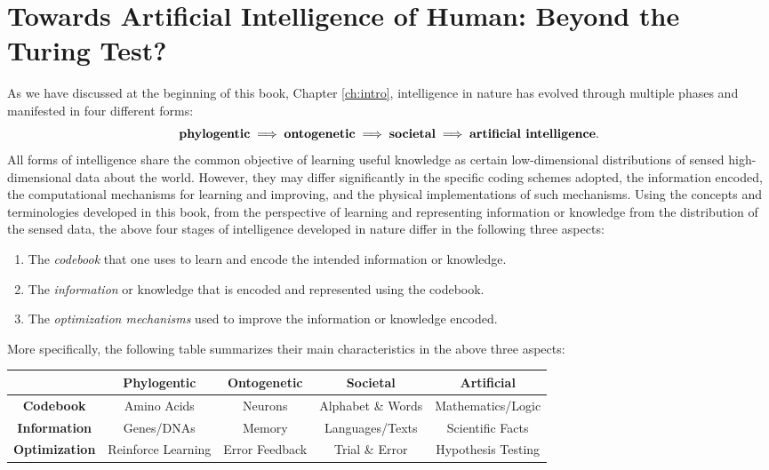 \documentclass[../../book-main.tex]{subfiles}
\begin{document}
\section{Towards Artificial Intelligence of Human: Beyond the Turing Test?}
As we have discussed at the beginning of this book, Chapter \ref{ch:intro}, intelligence in nature has evolved through multiple phases and manifested in four different forms:
\begin{equation}
\mbox{\textbf{phylogentic}} \;
   \Longrightarrow \; \mbox{\textbf{ontogenetic}} \; \Longrightarrow \; 
   \mbox{\textbf{societal}}
   \; \Longrightarrow \; 
   \mbox{\textbf{artificial intelligence}}.
\end{equation}
All forms of intelligence share the common objective of learning useful knowledge as certain low-dimensional distributions of sensed high-dimensional data about the world. However, they may differ significantly in the specific coding schemes adopted, the information encoded, the computational mechanisms for learning and improving, and the physical implementations of such mechanisms. Using the concepts and terminologies developed in this book, from the perspective of learning and representing information or knowledge from the distribution of the sensed data, the above four stages of intelligence developed in nature differ in the following three aspects:
\begin{enumerate}
    \item The {\em codebook} that one uses to learn and encode the intended information or knowledge.
    \item The {\em information} or knowledge that is encoded and represented using the codebook. 
    \item The {\em optimization mechanisms} used to improve the information or knowledge encoded.
\end{enumerate}
More specifically, the following table summarizes their main characteristics in the above three aspects:
\begin{center}
\begin{tabular}{| c | c | c | c | c |}
\hline & \textbf{Phylogentic} & \textbf{Ontogenetic} & \textbf{Societal} & \textbf{Artificial}\\
\hline
\textbf{Codebook}  & Amino Acids & Neurons & Alphabet \& Words & Mathematics/Logic \\ [0.5ex]
  \hline 
\textbf{Information} & Genes/DNAs & Memory & Languages/Texts & Scientific Facts\\ [0.5ex]
  \hline
\textbf{Optimization} & Reinforce Learning & Error Feedback & Trial \& Error & Hypothesis Testing \\  [0.5ex]
\hline
\end{tabular}
\end{center}
\end{document}
